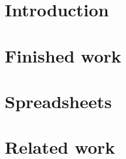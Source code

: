 \documentclass{book}
\begin{document}

\chapter{Introduction}  
\chapter{Finished work} 
\chapter{Spreadsheets}  
\chapter{Related work}  
\end{document}

